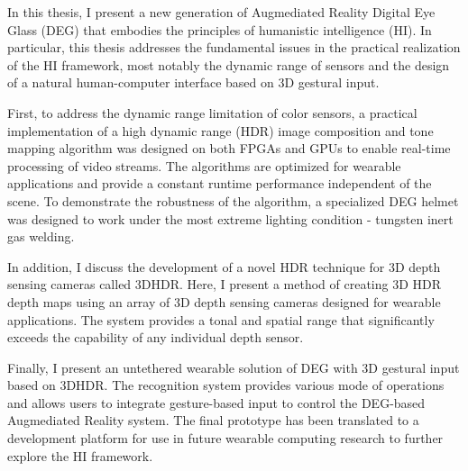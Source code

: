 In this thesis, I present a new generation of Augmediated Reality Digital Eye Glass (DEG) that embodies the principles of humanistic intelligence (HI).  In particular, this thesis addresses the fundamental issues in the practical realization of the HI framework, most notably the dynamic range of sensors and the design of a natural human-computer interface based on 3D gestural input.  

First, to address the dynamic range limitation of color sensors, a practical implementation of a high dynamic range (HDR) image composition and tone mapping algorithm was designed on both FPGAs and GPUs to enable real-time processing of video streams. The algorithms are optimized for wearable applications and provide a constant runtime performance independent of the scene. To demonstrate the robustness of the algorithm, a specialized DEG helmet was designed to work under the most extreme lighting condition - tungsten inert gas welding. 

In addition, I discuss the development of a novel HDR technique for 3D depth sensing cameras called 3DHDR.  Here, I present a method of creating 3D HDR depth maps using an array of 3D depth sensing cameras designed for wearable applications. The system provides a tonal and spatial range that significantly exceeds the capability of any individual depth sensor. 
 
Finally, I present an untethered wearable solution of DEG with 3D gestural input based on 3DHDR. The recognition system provides various mode of operations and allows users to integrate gesture-based input to control the DEG-based Augmediated Reality system. The final prototype has been translated to a development platform for use in future wearable computing research to further explore the HI framework. 